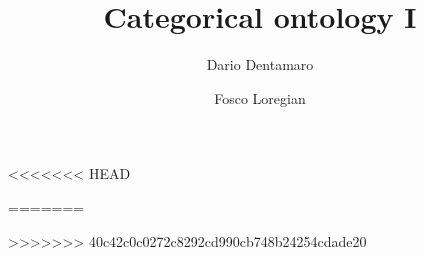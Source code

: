 \makeatletter
\def\@settitle{\begin{center}%
  \baselineskip14\p@\relax
  \bfseries
  \uppercasenonmath\@title
  \@title
  \ifx\@subtitle\@empty\else
     \\[1ex]\uppercasenonmath\@subtitle
     \footnotesize\mdseries\@subtitle
  \fi
  \end{center}%
}
\def\subtitle#1{\gdef\@subtitle{#1}}
\def\@subtitle{}
\makeatother

\newcommand{\var}[3][]{%
\left[%
\begin{smallmatrix}
  #2            \\%
  #1 \downarrow \\%
  #3%
\end{smallmatrix}%
\right]%
}

\newenvironment{xsmallmatrix}[1]
  {\renewcommand\thickspace{\kern#1}\smallmatrix}
  {\endsmallmatrix}
%
\newcommand{\cvar}[3]{%
\left[
\begin{xsmallmatrix}{0em}%
  & #1         \\ 
  #2 & \downarrow \\ 
  & #3%
\end{xsmallmatrix}%
\right]
}

\newcommand{\po}[1][dr]{\save*!/#1+1.5pc/#1:(1,-1)@^{|-}\restore}
\newcommand{\pb}[1][dr]{\save*!/#1-1.5pc/#1:(-1,1)@^{|-}\restore}
\def\theory#1{\textsf{#1}}
\def\CT{\theory{CT}\@\xspace}
\setlength{\epigraphwidth}{.6\textwidth}
\setcounter{tocdepth}{1}
%
\def\ra{\rangle}
\def\la{\langle}
\def\lr#1#2{\la #1,#2\ra}
\def\tr{\textsf{t}}
\newcommand{\true}{\texttt{t}}
\def\id{\text{id}}

<<<<<<< HEAD
\author{Dario Dentamaro}
\address{ Dario \textsc{Dentamaro}: Università degli Studi di Firenze, Dipartimento di Matematica e Informatica
        }
%
\author{Fosco Loregian}
\address{ Fosco \textsc{Loregian}: %
          Tallinn University of Technology, %
          Institute of Cybernetics, Akadeemia tee 15/2, %
          12618 Tallinn, Estonia%
        }
=======

>>>>>>> 40c42c0c0272c8292cd990cb748b24254cdade20

\title{Categorical ontology I}
\subtitle{Existence}

\usepackage{ xspace
           , proof
           , fontawesome
           , listings
           , anyfontsize
           , tikzsymbols
           }
\usepackage{devanagari}

